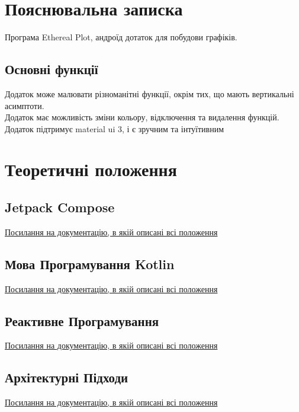 \documentclass[14pt]{article}
\begin{document}
    \section{Пояснювальна записка}
    Програма Ethereal Plot, андроїд дотаток для побудови графіків.


    \subsection{Основні функції}
    Додаток може малювати різноманітні функції, окрім тих, що мають вертикальні асимптоти. \\
    Додаток має можливість зміни кольору, відключення та видалення функцій. \\
    Додаток підтримує material ui 3, і є зручним та інтуїтивним

    
    \section{Теоретичні положення}
    \subsection{Jetpack Compose}
    \href{https://developer.android.com/jetpack/compose/documentation}{Посилання на документацію, в якій описані всі положення}

    \subsection{Мова Програмування Kotlin}
    \href{https://kotlinlang.org/docs/home.html}{Посилання на документацію, в якій описані всі положення}

    \subsection{Реактивне Програмування}
    \href{ https://kotlinlang.org/docs/flow.html}{Посилання на документацію, в якій описані всі положення}

    \subsection{Архітектурні Підходи}
    \href{https://developer.android.com/jetpack/compose/architecture}{Посилання на документацію, в якій описані всі положення}

    
  
\end{document}
